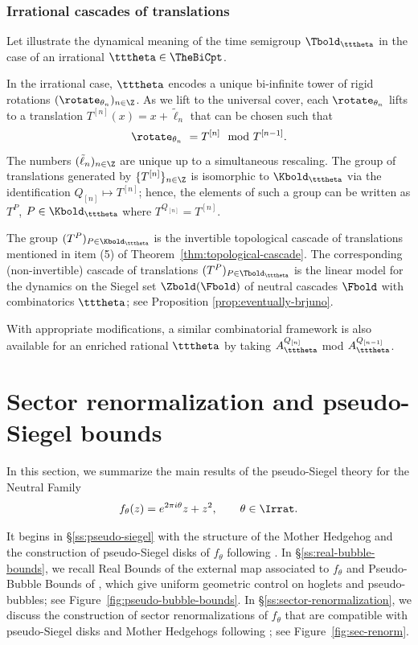 \documentclass{amsart}
\begin{document}
\subsubsection{Irrational cascades of translations}\label{sss:irrat.cascade} Let illustrate the dynamical meaning of the time semigroup $\Tbold_{\tttheta}$ in the case of an irrational $\tttheta \in \TheBiCpt$. 

In the irrational case, $\tttheta$ encodes a unique bi-infinite tower of rigid rotations $(\rotate_{\theta_n})_{n\in\Z}$.
As we lift to the universal cover, each $\rotate_{\theta_n}$ lifts to a translation $T^{[n]}(x) = x+ \tilde{\ell}_n$ that can be chosen such that
\[ 
\rotate_{\theta_n} \ = T^{[n]} \mod T^{[n-1]}.
\]
The numbers $(\tilde \ell_n)_{n \in \Z}$ are unique up to a simultaneous rescaling. 
The group of translations generated by $\{T^{[n]}\}_{n\in\Z}$ is isomorphic to $\Kbold_{\tttheta}$ via the identification $Q_{[n]} \mapsto T^{[n]}$;
hence, the elements of such a group can be written as $T^P$, $P \in \Kbold_{\tttheta}$ where $T^{Q_{[n]}} = T^{[n]}$.

The group $(T^P)_{P \in \Kbold_{\tttheta}}$ is the invertible topological cascade of translations mentioned in item (5) of Theorem~\ref{thm:topological-cascade}. 
The corresponding (non-invertible) cascade of translations $(T^P)_{P \in \Tbold_{\tttheta}}$ is the linear model for the dynamics on the Siegel set $\Zbold(\Fbold)$ of neutral cascades $\Fbold$ with combinatorics $\tttheta$; see Proposition \ref{prop:eventually-brjuno}.

With appropriate modifications, a similar combinatorial framework is also available for an enriched rational $\tttheta$ by taking $A_{\tttheta}^{Q_{[n]}}$ mod $A_{\tttheta}^{Q_{[n-1]}}$. 


\section{Sector renormalization and pseudo-Siegel bounds}
\label{sec:pseudo-Siegel}
 
In this section, we summarize the main results of the pseudo-Siegel theory for the Neutral Family
\[
f_\theta(z) = e^{2\pi i \theta} z + z^2, \qquad \theta \in \Irrat.
\]

It begins in \S\ref{ss:pseudo-siegel} with the structure of the Mother Hedgehog and the construction of pseudo-Siegel disks of $f_\theta$ following \cite{DLy22}.
In \S\ref{ss:real-bubble-bounds}, we recall Real Bounds of the external map associated to $f_\theta$ and Pseudo-Bubble Bounds of \cite{DLi26}, which give uniform geometric control on hoglets and pseudo-bubbles; see Figure~\ref{fig:pseudo-bubble-bounds}.
In \S\ref{ss:sector-renormalization}, we discuss the construction of sector renormalizations of $f_\theta$ that are compatible with pseudo-Siegel disks and Mother Hedgehogs following \cite{DLy26a}; see Figure~\ref{fig:sec-renorm}.
\end{document}
